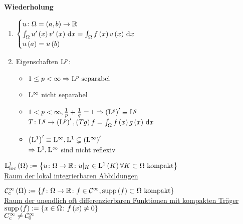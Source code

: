 \textbf{Wiederholung}\\
\begin{enumerate}
\item	
	$\begin{cases}
			u\colon\Omega=\left(a,b\right)\to\mathbb{R}\\
			\int_{\Omega}u^{\prime}\left(x\right)v^{\prime}\left(x\right)\,\mathrm{d}x = \int_{\Omega}f\left(x\right)v\left(x\right)\,\mathrm{d}x\\
			u\left(a\right)=u\left(b\right)
		\end{cases}$
\item{}
	Eigenschaften $\mathrm{L}^{p}$:\\
	\begin{itemize}
		\item $1\leq p <\infty \Rightarrow \mathrm{L}^{p}\text{ separabel}$
		\item $\mathrm{L}^{\infty}$ nicht separabel
		\item $1 < p <\infty, \frac{1}{p}+\frac{1}{q}=1 \Rightarrow \left(\mathrm{L}^{p}\right)^{\prime} \equiv \mathrm{L}^{q}$\\
			  $T\colon \mathrm{L}^{q}\to\left(\mathrm{L}^{p}\right)^{\prime}, \left(Tg\right)f = \int_{\Omega}f\left(x\right)g\left(x\right)\,\mathrm{d}x$
		\item $\left(\mathrm{L}^{1}\right)^{\prime}\equiv\mathrm{L}^{\infty}, \mathrm{L}^{1}\subsetneq\left(\mathrm{L}^{\infty}\right)^{\prime}$\\
				$\Rightarrow \mathrm{L}^{1}, \mathrm{L}^{\infty}$ sind nicht reflexiv
	\end{itemize}
\end{enumerate}

\begin{definition}
	$\mathrm{L}^{1}_{\text{loc}}\left(\Omega\right) := \left\{u\colon\Omega\to\mathbb{R}\colon u|_{K}\in\mathrm{L}^{1}\left(K\right)\forall K\subset\Omega \text{ kompakt}\right\}$\\
	\underline{Raum der lokal integrierbaren Abbildungen}
\end{definition}

\begin{definition}
	$\mathcal{C}^{\infty}_{\text{c}}\left(\Omega\right) := \left\{f\colon\Omega\to\mathbb{R}\colon f\in\mathcal{C}^{\infty},\operatorname{supp}\left(f\right)\subset\Omega\text{ kompakt}\right\}$\\
	\underline{Raum der unendlich oft differenzierbaren Funktionen mit kompakten Träger}\\
	$\operatorname{supp}\left(f\right):=\left\{x\in\Omega\colon f\left(x\right)\neq 0\right\}$\\
	\boldmath$C^{\infty}_{\text{c}}\neq \mathcal{C}^{\infty}_{0}$
\end{definition}

